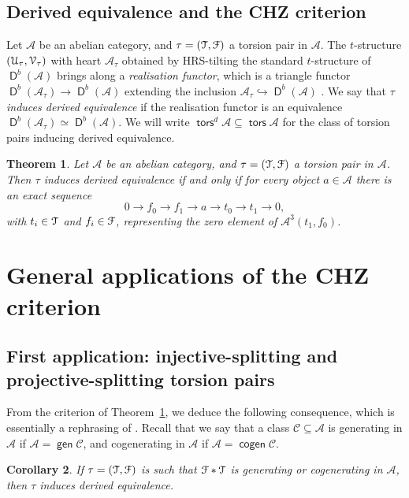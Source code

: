 \documentclass[a4paper,11pt]{amsart}
\theoremstyle{plain}
\newtheorem{thm}{Theorem}[section]
\newtheorem{cor}[thm]{Corollary}
\theoremstyle{definition}
\newcommand{\Acal}{\mathcal{A}} \newcommand{\Bcal}{\mathcal{B}} \newcommand{\Ccal}{\mathcal{C}}
\newcommand{\Vcal}{\mathcal{V}} \newcommand{\Wcal}{\mathcal{W}} \newcommand{\Xcal}{\mathcal{X}}
\DeclareMathOperator{\gen}{\mathsf{gen}}
\DeclareMathOperator{\cogen}{\mathsf{cogen}}
\DeclareMathOperator{\tors}{\mathsf{tors}}
\DeclareMathOperator{\D}{\mathsf{D}}
\begin{document}
\subsection{Derived equivalence and the CHZ
criterion}\label{subsec:derived-equivalence}

Let $\Acal$ be an abelian category, and $\tau=(\mathcal{T},\mathcal{F})$ a torsion pair in
$\Acal$. The $t$-structure $(\Ucal_\tau,\Vcal_\tau)$ with heart $\Acal_\tau$ obtained by HRS-tilting the
standard $t$-structure of $\D^b(\Acal)$ brings along a \emph{realisation
functor}, which is a triangle functor $\D^b(\Acal_\tau)\to \D^b(\Acal)$
extending the inclusion $\Acal_\tau\hookrightarrow\D^b(\Acal)$ \cite{bbd-81}. We say
that $\tau$ \emph{induces derived equivalence} if the realisation functor is an
equivalence $\D^b(\Acal_\tau)\simeq\D^b(\Acal)$.
We will write $\tors^d{\Acal}\subseteq\tors{\Acal}$ for the class of torsion
pairs inducing derived equivalence.

\begin{thm}{{\cite[Thm.~A]{chen-han-zhou-19}}}\label{thm:chz}
	Let $\Acal$ be an abelian category, and $\tau=(\mathcal{T},\mathcal{F})$ a torsion pair in
	$\Acal$. Then $\tau$ induces derived equivalence if and only if for every
	object $a\in\Acal$ there is an exact sequence
	\[0\to f_0\to f_1\to a\to t_0\to t_1\to 0,\]
	with $t_i\in\mathcal{T}$ and $f_i\in\mathcal{F}$, representing the zero element of
	$\Acal^3(t_1,f_0)$.
\end{thm}

\section{General applications of the CHZ criterion}
\label{sec:general-applications}

\subsection{First application: injective-splitting and projective-splitting
torsion pairs}
\label{subsec:stable}

From the criterion of Theorem~\ref{thm:chz}, we deduce the following
consequence, which is essentially a rephrasing of
\cite[Cor.~4.1]{chen-han-zhou-19}. Recall that we say that a class
$\Ccal\subseteq\Acal$ is generating in $\Acal$ if $\Acal=\gen\Ccal$, and cogenerating
in $\Acal$ if $\Acal=\cogen\Ccal$.

\begin{cor}\label{cor:F*T}
	If $\tau=(\mathcal{T},\mathcal{F})$ is such that $\mathcal{F}\ast\mathcal{T}$ is generating or
	cogenerating in $\Acal$, then $\tau$ induces derived equivalence.
\end{cor}
\end{document}

